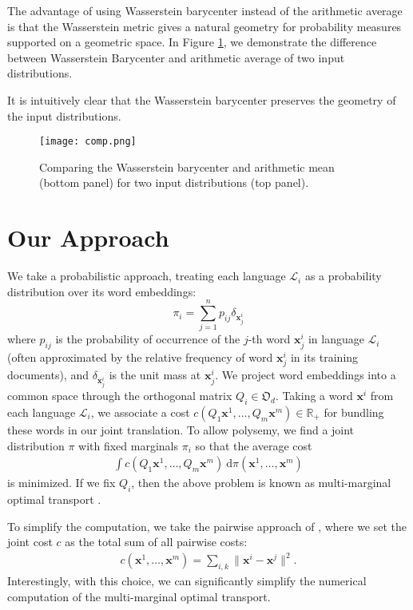 \documentclass{article}
\newcommand{\RR}{\mathds{R}}
\newcommand{\OO}{\mathfrak{O}}
\newcommand{\Lc}{\mathcal{L}}
\newcommand{\xv}{\mathbf{x}}
\begin{document}
The advantage of using Wasserstein barycenter instead of the arithmetic average is that the Wasserstein metric gives a natural geometry for probability measures supported on a geometric space. In Figure \ref{fig:barycenter-1}, we demonstrate the difference between Wasserstein Barycenter and arithmetic average of two input distributions. 

It is intuitively clear that the Wasserstein barycenter preserves the geometry of the input distributions.
\begin{figure}
    \centering
    \texttt{[image: comp.png]}
\caption{Comparing the Wasserstein barycenter and arithmetic mean (bottom panel) for two input distributions (top panel).}
    \label{fig:barycenter-1}
\end{figure}

 \section{Our Approach}


We take a probabilistic approach, treating each language $\Lc_i$ as a probability distribution over its word embeddings:
\begin{equation}
    \pi_i = \sum_{j=1}^n p_{ij} \delta_{\xv^i_{j}} 
\end{equation}
where $p_{ij}$ is the probability of occurrence of the $j$-th word $\xv_{j}^i$ in language $\Lc_i$ (often approximated by the relative frequency of word $\xv_{j}^i$ in its training documents), and  $\delta_{\xv^i_{j}}$ is the unit mass at $\xv_{j}^i$. We project word embeddings into a common space through the orthogonal matrix $Q_i \in \OO_d$. Taking a word $\xv^i$ from each language $\Lc_i$, we associate a cost $c(Q_1\xv^1, \ldots, Q_m \xv^m) \in \RR_+$ for bundling these words in our joint translation. To allow polysemy, we find a joint  distribution $\pi$ with fixed marginals $\pi_i$ so that the average cost
\begin{align}
\label{eq:mOT}
\int c(Q_1 \xv^1, \ldots, Q_m \xv^m) ~ \mathrm{d} \pi(\xv^1, \ldots, \xv^m)
\end{align}
is minimized.
If we fix $Q_i$, then the above problem is known as multi-marginal optimal transport \cite{GangboSwiech98}.

To simplify the computation, we take the pairwise approach of \citet{AlauxGCJ19}, where we set the joint cost $c$ as the total sum of all pairwise costs:
\begin{align}
\label{eq:pwd}
\textstyle
c(\xv^1, \ldots, \xv^m) = \sum_{i, k} \|\xv^i - \xv^j \|^2.
\end{align}
Interestingly, with this choice, we can significantly simplify the numerical computation of the multi-marginal optimal transport. 
\end{document}

